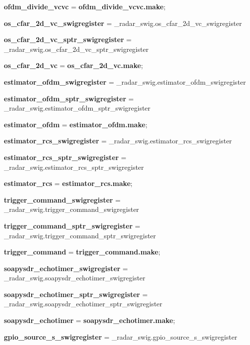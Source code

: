 \begin{DoxyCompactItemize}
\item 
{\bf ofdm\+\_\+divide\+\_\+vcvc} = {\bf ofdm\+\_\+divide\+\_\+vcvc.\+make};
\item 
{\bf os\+\_\+cfar\+\_\+2d\+\_\+vc\+\_\+swigregister} = \+\_\+radar\+\_\+swig.\+os\+\_\+cfar\+\_\+2d\+\_\+vc\+\_\+swigregister
\item 
{\bf os\+\_\+cfar\+\_\+2d\+\_\+vc\+\_\+sptr\+\_\+swigregister} = \+\_\+radar\+\_\+swig.\+os\+\_\+cfar\+\_\+2d\+\_\+vc\+\_\+sptr\+\_\+swigregister
\item 
{\bf os\+\_\+cfar\+\_\+2d\+\_\+vc} = {\bf os\+\_\+cfar\+\_\+2d\+\_\+vc.\+make};
\item 
{\bf estimator\+\_\+ofdm\+\_\+swigregister} = \+\_\+radar\+\_\+swig.\+estimator\+\_\+ofdm\+\_\+swigregister
\item 
{\bf estimator\+\_\+ofdm\+\_\+sptr\+\_\+swigregister} = \+\_\+radar\+\_\+swig.\+estimator\+\_\+ofdm\+\_\+sptr\+\_\+swigregister
\item 
{\bf estimator\+\_\+ofdm} = {\bf estimator\+\_\+ofdm.\+make};
\item 
{\bf estimator\+\_\+rcs\+\_\+swigregister} = \+\_\+radar\+\_\+swig.\+estimator\+\_\+rcs\+\_\+swigregister
\item 
{\bf estimator\+\_\+rcs\+\_\+sptr\+\_\+swigregister} = \+\_\+radar\+\_\+swig.\+estimator\+\_\+rcs\+\_\+sptr\+\_\+swigregister
\item 
{\bf estimator\+\_\+rcs} = {\bf estimator\+\_\+rcs.\+make};
\item 
{\bf trigger\+\_\+command\+\_\+swigregister} = \+\_\+radar\+\_\+swig.\+trigger\+\_\+command\+\_\+swigregister
\item 
{\bf trigger\+\_\+command\+\_\+sptr\+\_\+swigregister} = \+\_\+radar\+\_\+swig.\+trigger\+\_\+command\+\_\+sptr\+\_\+swigregister
\item 
{\bf trigger\+\_\+command} = {\bf trigger\+\_\+command.\+make};
\item 
{\bf soapysdr\+\_\+echotimer\+\_\+swigregister} = \+\_\+radar\+\_\+swig.\+soapysdr\+\_\+echotimer\+\_\+swigregister
\item 
{\bf soapysdr\+\_\+echotimer\+\_\+sptr\+\_\+swigregister} = \+\_\+radar\+\_\+swig.\+soapysdr\+\_\+echotimer\+\_\+sptr\+\_\+swigregister
\item 
{\bf soapysdr\+\_\+echotimer} = {\bf soapysdr\+\_\+echotimer.\+make};
\item 
{\bf gpio\+\_\+source\+\_\+s\+\_\+swigregister} = \+\_\+radar\+\_\+swig.\+gpio\+\_\+source\+\_\+s\+\_\+swigregister
\item 

\end{DoxyCompactItemize}
